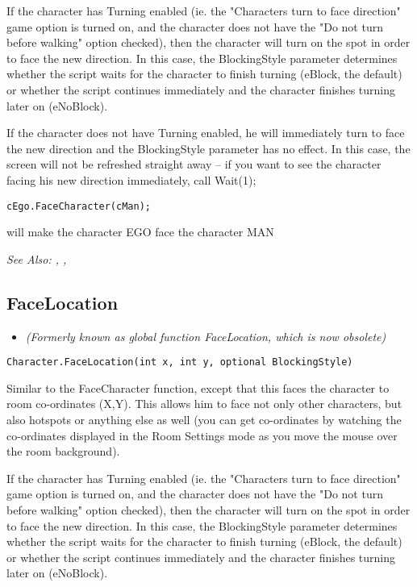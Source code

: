 If the character has Turning enabled (ie. the "Characters turn to face direction" game
option is turned on, and the character does not have the "Do not turn before walking"
option checked), then the character will turn on the spot in order to face the new direction.
In this case, the BlockingStyle parameter determines whether the script waits for the
character to finish turning (eBlock, the default) or whether the script continues immediately
and the character finishes turning later on (eNoBlock).

If the character does not have Turning enabled, he will immediately turn to face the
new direction and the BlockingStyle parameter has no effect. In this case, the screen
will not be refreshed straight away -- if you want to see the character facing his new direction
immediately, call  Wait(1);

\begin{verbatim}
cEgo.FaceCharacter(cMan);
\end{verbatim}
will make the character EGO face the character MAN

\it{See Also:} ,
,


\subsection{FaceLocation}\label{Character.FaceLocation}%

\begin{itemize}
\item \it{(Formerly known as global function FaceLocation, which is now obsolete)}
\end{itemize}

\begin{verbatim}
Character.FaceLocation(int x, int y, optional BlockingStyle)
\end{verbatim}
Similar to the FaceCharacter function, except that this faces the character
to room co-ordinates (X,Y). This allows him to face not only other characters,
but also hotspots or anything else as well (you can get co-ordinates by
watching the co-ordinates displayed in the Room Settings mode as you move the mouse
over the room background).

If the character has Turning enabled (ie. the "Characters turn to face direction" game
option is turned on, and the character does not have the "Do not turn before walking"
option checked), then the character will turn on the spot in order to face the new direction.
In this case, the BlockingStyle parameter determines whether the script waits for the
character to finish turning (eBlock, the default) or whether the script continues immediately
and the character finishes turning later on (eNoBlock).

